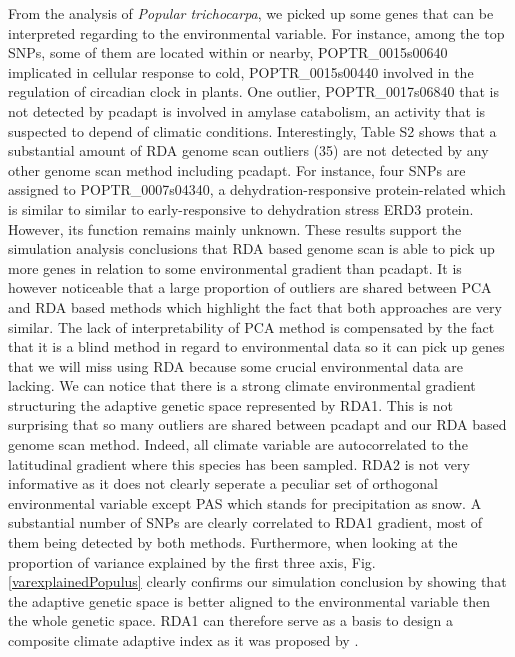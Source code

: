 \documentclass[a4paper,times,10pt,authoryear]{article}%
\begin{document}
From the analysis of \textit{Popular trichocarpa}, we picked up some genes that can be interpreted regarding to the environmental variable. For instance, among the top SNPs, some of them are located within or nearby, POPTR\_0015s00640 implicated in cellular response to cold, POPTR\_0015s00440 involved in the regulation of circadian clock in plants. One outlier, POPTR\_0017s06840 that is not detected by pcadapt is involved in amylase catabolism, an activity that is suspected to depend of climatic conditions. Interestingly, Table S2 shows that a substantial amount of RDA genome scan outliers (35) are not detected by any other genome scan method including pcadapt. For instance, four SNPs are assigned to POPTR\_0007s04340, a dehydration-responsive protein-related which is similar to similar to early-responsive to dehydration stress ERD3 protein. However, its function remains mainly unknown. These results support the simulation analysis conclusions that RDA based genome scan is able to pick up more genes in relation to some environmental gradient than pcadapt. It is however noticeable that a large proportion of outliers are shared between PCA and RDA based methods which highlight the fact that both approaches are very similar. The lack of interpretability of PCA method is compensated by the fact that it is a blind method in regard to environmental data so it can pick up genes that we will miss using RDA because some crucial environmental data are lacking.
We can notice that there is a strong climate environmental gradient structuring the adaptive genetic space represented by RDA1. This is not surprising that so many outliers are shared between pcadapt and our RDA based genome scan method. Indeed, all climate variable are autocorrelated to the latitudinal gradient where this species has been sampled. RDA2 is not very informative as it does not clearly seperate a peculiar set of orthogonal environmental variable except PAS which stands for precipitation as snow. A substantial number of SNPs are clearly correlated to RDA1 gradient, most of them being detected by both methods. Furthermore, when looking at the proportion of variance explained by the first three axis, Fig. \ref{varexplainedPopulus} clearly confirms our simulation conclusion by showing that the adaptive genetic space is better aligned to the environmental variable then the whole genetic space. RDA1 can therefore serve as a basis to design a composite climate adaptive index as it was proposed by \citet{Steane2014a}.
\end{document}
